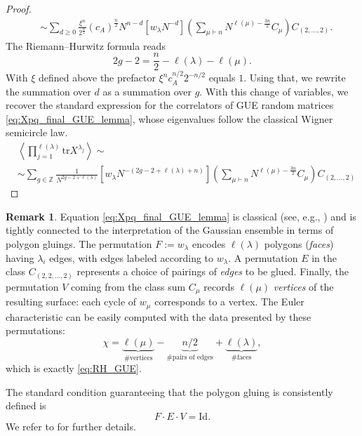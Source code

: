 \documentclass{article}
\newcommand{\tr}{\mathrm{tr}}
\theoremstyle{plain}
\theoremstyle{definition}
\newtheorem{remark}[thm]{Remark}
\numberwithin{equation}{section}
\begin{document}
\begin{proof}
\begin{equation}
\begin{aligned}
        & \sim \sum\limits_{d\ge 0}  \frac{\xi^n}{2^{\frac n2}} (c_A)^{\frac n2} N^{n- d} [w_\lambda N^{-d}] \left(\sum_{\mu \vdash n}N^{\ell(\mu)- \frac{3n}{2}} C_\mu \right) C_{(2,\dots,2)} .
    \end{aligned}
\end{equation}
The Riemann–Hurwitz formula reads
\begin{equation}
    \label{eq:RH_GUE}
    2g-2 = \frac{n}{2} - \ell(\lambda) - \ell(\mu).
\end{equation}
With $\xi$ defined above the prefactor $\xi^n c_A^{n/2}2^{-n/2}$ equals $1$. Using that, we rewrite the summation over $d$ as a summation over $g$. With this change of variables, we recover the standard expression for the correlators of GUE random matrices \eqref{eq:Xpq_final_GUE_lemma}, whose eigenvalues follow the classical Wigner semicircle law.
\begin{equation}
    \label{eq:Xpq_final_GUE}
    \begin{aligned}
        & \left\langle \prod_{j=1}^{\ell(\lambda)} \tr X^{\lambda_{j}} \right\rangle \sim \\
        & \sim \sum\limits_{g \in \mathbb{Z}} \frac{1}{N^{2g-2+\ell(\lambda)}}  [w_\lambda N^{-\left(2g-2+\ell(\lambda)+ n \right)}] \left(\sum_{\mu \vdash n}N^{\ell(\mu)- \frac{3n}{2}} C_\mu \right) C_{(2,\dots,2)} 
    \end{aligned}
\end{equation}
\end{proof}

\begin{remark}
Equation \eqref{eq:Xpq_final_GUE_lemma} is classical (see, e.g., \cite{Borot_2020, okounkov2000random}) and is tightly connected to the interpretation of the Gaussian ensemble in terms of polygon gluings. The permutation $F:=w_\lambda$ encodes $\ell(\lambda)$ polygons (\emph{faces}) having $\lambda_i$ edges, with edges labeled according to $w_\lambda$. A permutation $E$ in the class $C_{(2,2,\dots,2)}$ represents a choice of pairings of \emph{edges} to be glued. Finally, the permutation $V$ coming from the class sum $C_\mu$ records $\ell(\mu)$ \emph{vertices} of the resulting surface: each cycle of $w_\mu$ corresponds to a vertex. The Euler characteristic can be easily computed with the data presented by these permutations:
\begin{equation}
    \chi = \underbrace{\ell(\mu)}_{\#\text{vertices}}-\underbrace{n/2}_{\#\text{pairs of edges}} + \underbrace{\ell(\lambda)}_{\#\text{faces}},
\end{equation}
which is exactly \eqref{eq:RH_GUE}.

The standard condition guaranteeing that the polygon gluing is consistently defined is
\begin{equation}
    F \cdot E \cdot V = \mathrm{Id}. 
\end{equation}
We refer to \cite[Section 2]{Borot_2020} for further details.
\end{remark}
\end{document}
